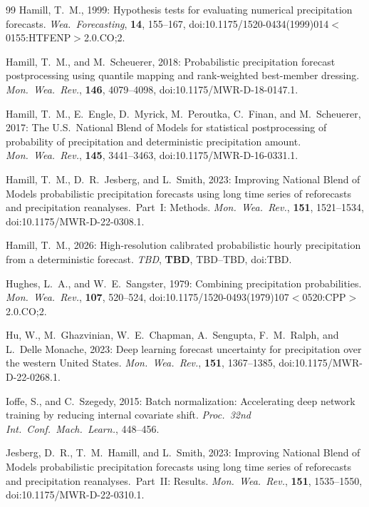 \documentclass[11pt]{article}
\begin{document}
\begin{thebibliography}{99}
Hamill, T.~M., 1999:
Hypothesis tests for evaluating numerical precipitation forecasts.
\textit{Wea.\ Forecasting}, \textbf{14}, 155--167,
doi:10.1175/1520-0434(1999)014$<$0155:HTFENP$>$2.0.CO;2.

Hamill, T.~M., and M.\ Scheuerer, 2018:
Probabilistic precipitation forecast postprocessing using quantile mapping
and rank-weighted best-member dressing.
\textit{Mon.\ Wea.\ Rev.}, \textbf{146}, 4079--4098,
doi:10.1175/MWR-D-18-0147.1.

Hamill, T.~M., E.\ Engle, D.\ Myrick, M.\ Peroutka, C.\ Finan,
and M.\ Scheuerer, 2017:
The U.S.\ National Blend of Models for statistical postprocessing of
probability of precipitation and deterministic precipitation amount.
\textit{Mon.\ Wea.\ Rev.}, \textbf{145}, 3441--3463,
doi:10.1175/MWR-D-16-0331.1.

Hamill, T.~M., D.~R.\ Jesberg, and L.\ Smith, 2023:
Improving National Blend of Models probabilistic precipitation forecasts using
long time series of reforecasts and precipitation reanalyses.\ Part~I: Methods.
\textit{Mon.\ Wea.\ Rev.}, \textbf{151}, 1521--1534,
doi:10.1175/MWR-D-22-0308.1.

Hamill, T.~M., 2026:
High-resolution calibrated probabilistic hourly precipitation from a
deterministic forecast.
\textit{TBD}, \textbf{TBD}, TBD--TBD,
doi:TBD.

Hughes, L.~A., and W.~E.\ Sangster, 1979:
Combining precipitation probabilities.
\textit{Mon.\ Wea.\ Rev.}, \textbf{107}, 520--524,
doi:10.1175/1520-0493(1979)107$<$0520:CPP$>$2.0.CO;2.

Hu, W., M.\ Ghazvinian, W.~E.\ Chapman, A.\ Sengupta, F.~M.\ Ralph, and
L.\ Delle Monache, 2023:
Deep learning forecast uncertainty for precipitation over the western
United States.
\textit{Mon.\ Wea.\ Rev.}, \textbf{151}, 1367--1385,
doi:10.1175/MWR-D-22-0268.1.

Ioffe, S., and C.\ Szegedy, 2015:
Batch normalization: Accelerating deep network training by
reducing internal covariate shift.
\textit{Proc.\ 32nd Int.\ Conf.\ Mach.\ Learn.}, 448--456.

Jesberg, D.~R., T.~M.\ Hamill, and L.\ Smith, 2023:
Improving National Blend of Models probabilistic precipitation forecasts using
long time series of reforecasts and precipitation reanalyses.\ Part~II: Results.
\textit{Mon.\ Wea.\ Rev.}, \textbf{151}, 1535--1550,
doi:10.1175/MWR-D-22-0310.1.


\end{thebibliography}
\end{document}
